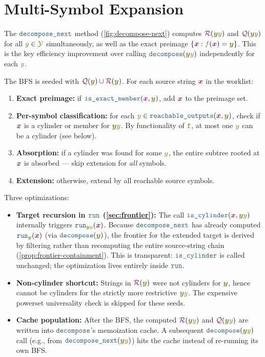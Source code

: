 \documentclass{article}
\theoremstyle{plain}
\newcommand{\Quotient}{{\color{TokenColor}\mathcal{Q}}}
\newcommand{\Remainder}{{\color{TokenColor}\mathcal{R}}}
\newcommand{\transFnSym}[0]{f}
\newcommand{\transFn}{\ensuremath{{\color{CharacterColor}\transFnSym}}\xspace}
\newcommand{\srcStr}{\ensuremath{{\color{TokenColor}\boldsymbol{x}}}\xspace}
\newcommand{\tgtSym}{{\color{CharacterColor}y}}
\newcommand{\tgtStr}{{\color{CharacterColor}\boldsymbol{y}}}
\newcommand{\tgtAlphabet}[0]{{\color{CharacterColor}\ensuremath{\mathcal{Y}}}\xspace}
\newcommand{\transST}{{\color{CharacterColor}\texttt{f}}}
\newcommand{\myMintedFunc}[1]{\mbox{\texttt{{\color{StormBlue}#1}}}}
\newcommand{\continuous}[0]{\myMintedFunc{is\_cylinder}}
\newcommand{\decompose}[0]{\myMintedFunc{decompose}}
\newcommand{\runFrontier}[0]{\myMintedFunc{run}}
\newcommand{\reachableOutputs}[0]{\myMintedFunc{reachable\_outputs}}
\newcommand{\isExactMember}[0]{\myMintedFunc{is\_exact\_member}}
\newcommand{\decomposeNext}[0]{\myMintedFunc{decompose\_next}}
\begin{document}
\section{Multi-Symbol Expansion}
\label{sec:decompose-next}

The $\decomposeNext$ method (\cref{fig:decompose-next}) computes
$\Remainder(\tgtStr\tgtSym)$ and $\Quotient(\tgtStr\tgtSym)$ for all
$\tgtSym \in \tgtAlphabet$ simultaneously, as well as the exact preimage
$\{\srcStr : \transFn(\srcStr) = \tgtStr\}$.
This is the key efficiency improvement over calling $\decompose(\tgtStr\tgtSym)$
independently for each $\tgtSym$.

The BFS is seeded with $\Quotient(\tgtStr) \cup \Remainder(\tgtStr)$.
For each source string $\srcStr$ in the worklist:
\begin{enumerate}
\item \textbf{Exact preimage:} if $\isExactMember(\srcStr, \tgtStr)$,
  add $\srcStr$ to the preimage set.
\item \textbf{Per-symbol classification:} for each
  $\tgtSym \in \reachableOutputs(\srcStr, \tgtStr)$, check if $\srcStr$ is a
  cylinder or member for $\tgtStr\tgtSym$.
  By functionality of $\transST$, at most one $\tgtSym$ can be a cylinder
  (see below).
\item \textbf{Absorption:} if a cylinder was found for some $\tgtSym$, the
  entire subtree rooted at $\srcStr$ is absorbed --- skip extension for
  \emph{all} symbols.
\item \textbf{Extension:} otherwise, extend by all reachable source symbols.
\end{enumerate}

Three optimizations:
\begin{itemize}
\item \textbf{Target recursion in $\runFrontier$ (\cref{sec:frontier}):}
  The call $\continuous(\srcStr, \tgtStr\tgtSym)$ internally triggers
  $\runFrontier_{\tgtStr\tgtSym}(\srcStr)$.
  Because $\decomposeNext$ has already computed
  $\runFrontier_\tgtStr(\srcStr)$ (via $\decompose(\tgtStr)$), the frontier
  for the extended target is derived by filtering rather than recomputing the
  entire source-string chain (\cref{prop:frontier-containment}).
  This is transparent: $\continuous$ is called unchanged; the optimization
  lives entirely inside $\runFrontier$.
\item \textbf{Non-cylinder shortcut:}
  Strings in $\Remainder(\tgtStr)$ were not cylinders for $\tgtStr$,
  hence cannot be cylinders for the strictly more restrictive $\tgtStr\tgtSym$.
  The expensive powerset universality check is skipped for these seeds.
\item \textbf{Cache population:}
  After the BFS, the computed $\Remainder(\tgtStr\tgtSym)$ and
  $\Quotient(\tgtStr\tgtSym)$ are written into $\decompose$'s memoization
  cache.
  A subsequent $\decompose(\tgtStr\tgtSym)$ call (e.g., from
  $\decomposeNext(\tgtStr\tgtSym)$) hits the cache instead of re-running its
  own BFS.
\end{itemize}
\end{document}

